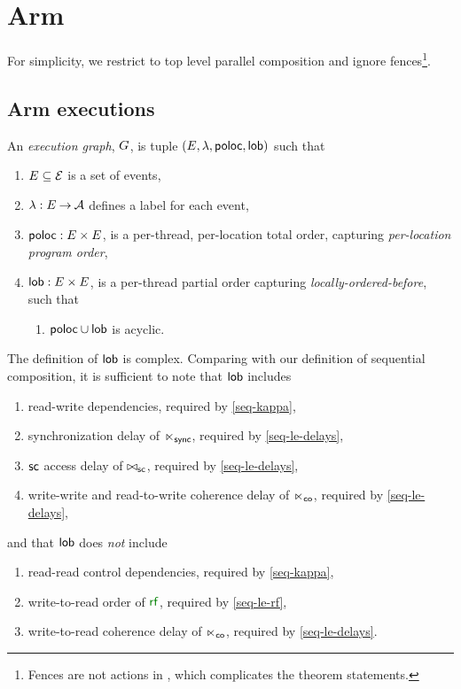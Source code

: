 \section{Arm}
\label{sec:arm}
For simplicity, we restrict to top level parallel composition and ignore
fences\footnote{Fences are not actions in \armeight{}, which complicates the
  theorem statements.}.

\subsection{Arm executions}
\begin{definition}
  An \emph{\armeight{} execution graph}, $G$, is tuple
  $(\aEvs, \labeling, {\rpoloc}, {\rlob})$ such that
  \begin{enumerate}[,label=(\textsc{a}\arabic*),ref=\textsc{a}\arabic*]
  \item $E\subseteq\mathcal{E}$ is a set of {events},
  \item $\lambda: E \mathbin\rightarrow \mathcal{A}$ defines a {label} for each event,
  \item ${\rpoloc} : \Event\times\Event$, is a per-thread, per-location total
    order, capturing \emph{per-location program order},
  \item ${\rlob} : \Event\times\Event$, is a per-thread partial order capturing
    \emph{locally-ordered-before}, such that
    \begin{enumerate}
    \item \label{arm-lob-poloc}
      ${\rpoloc} \cup {\rlob}$ is acyclic.
    \end{enumerate}
  \end{enumerate}
\end{definition}

The definition of $\rlob$ is complex.  Comparing with our definition of
sequential composition, it is sufficient to note that $\rlob$ includes
\begin{enumerate}[label=(\textsc{l}\arabic*),ref=\textsc{l}\arabic*]
\item read-write dependencies, required by \ref{seq-kappa},
\item synchronization delay of ${\mathrel{\ltimes}_{\mathsf{sync}}}$, required by \ref{seq-le-delays},
\item ${\mathsf{sc}}$ access delay of ${\mathrel{\bowtie}_{\mathsf{sc}}}$, required by \ref{seq-le-delays},
\item write-write and read-to-write coherence delay of ${\mathrel{\ltimes}_{\mathsf{co}}}$, required by \ref{seq-le-delays},
\end{enumerate}
and that $\rlob$ does \emph{not} include
\begin{enumerate}[resume,label=(\textsc{l}\arabic*),ref=\textsc{l}\arabic*]
\item \label{lob-rr} 
  read-read control dependencies, required by \ref{seq-kappa},
\item \label{lob-rf}
  write-to-read order of $\rrfx$, required by \ref{seq-le-rf},
\item \label{lob-wr}
  write-to-read coherence delay of ${\mathrel{\ltimes}_{\mathsf{co}}}$, required by \ref{seq-le-delays}.
\end{enumerate}


